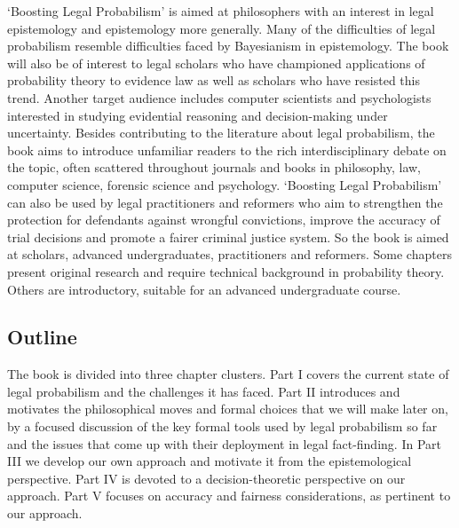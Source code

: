 \documentclass[
  10pt,
  dvipsnames,enabledeprecatedfontcommands]{scrartcl}
\begin{document}
`Boosting Legal Probabilism' is aimed at philosophers with an interest
in legal epistemology and epistemology more generally. Many of the
difficulties of legal probabilism resemble difficulties faced by
Bayesianism in epistemology. The book will also be of interest to legal
scholars who have championed applications of probability theory to
evidence law as well as scholars who have resisted this trend. Another
target audience includes computer scientists and psychologists
interested in studying evidential reasoning and decision-making under
uncertainty. Besides contributing to the literature about legal
probabilism, the book aims to introduce unfamiliar readers to the rich
interdisciplinary debate on the topic, often scattered throughout
journals and books in philosophy, law, computer science, forensic
science and psychology. `Boosting Legal Probabilism' can also be used by
legal practitioners and reformers who aim to strengthen the protection
for defendants against wrongful convictions, improve the accuracy of
trial decisions and promote a fairer criminal justice system. So the
book is aimed at scholars, advanced undergraduates, practitioners and
reformers. Some chapters present original research and require technical
background in probability theory. Others are introductory, suitable for
an advanced undergraduate course.

\vspace{-3mm}

\hypertarget{outline}{%
\subsection{Outline}\label{outline}}


The book is divided into three chapter clusters. Part I covers the
current state of legal probabilism and the challenges it has faced. Part
II introduces and motivates the philosophical moves and formal choices
that we will make later on, by a focused discussion of the key formal
tools used by legal probabilism so far and the issues that come up with
their deployment in legal fact-finding. In Part III we develop our own
approach and motivate it from the epistemological perspective. Part IV
is devoted to a decision-theoretic perspective on our approach. Part V
focuses on accuracy and fairness considerations, as pertinent to our
approach.

\vspace{2mm}
\end{document}
